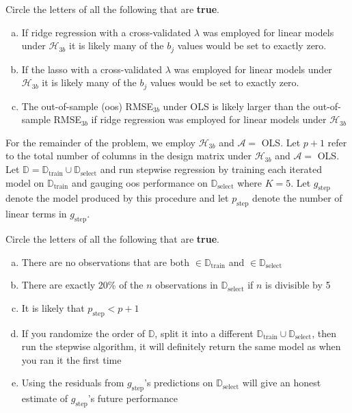 \documentclass[12pt]{article}
\begin{document}
 Circle the letters of all the following that are \textbf{true}.

\begin{enumerate}[(a)]
\item If ridge regression with a cross-validated $\lambda$ was employed for linear models under $\mathcal{H}_{3b}$ it is likely many of the $b_j$ values would be set to exactly zero.
\item If the lasso with a cross-validated $\lambda$ was employed for linear models under $\mathcal{H}_{3b}$ it is likely many of the $b_j$ values would be set to exactly zero.
\item The out-of-sample (oos) RMSE$_{3b}$ under OLS is likely larger than the out-of-sample RMSE$_{3b}$ if ridge regression was employed for linear models under $\mathcal{H}_{3b}$
\end{enumerate}

For the remainder of the problem, we employ $\mathcal{H}_{3b}$ and $\mathcal{A} = $ OLS. Let $p+1$ refer to the total number of columns in the design matrix under $\mathcal{H}_{3b}$ and $\mathcal{A} = $ OLS.\\

Let $\mathbb{D} = \mathbb{D}_{\text{train}} \cup \mathbb{D}_{\text{select}}$ and run stepwise regression by training each iterated model on $\mathbb{D}_{\text{train}}$ and gauging oos performance on $\mathbb{D}_{\text{select}}$ where $K=5$. Let $g_\text{step}$ denote the model produced by this procedure and let $p_\text{step}$ denote the number of linear terms in $g_\text{step}$.


 Circle the letters of all the following that are \textbf{true}.

\begin{enumerate}[(a)]
\item There are no observations that are both $\in \mathbb{D}_{\text{train}}$ and $\in \mathbb{D}_{\text{select}}$
\item There are exactly 20\% of the $n$ observations in $\mathbb{D}_{\text{select}}$ if $n$ is divisible by 5
\item It is likely that $p_\text{step} < p+1$
\item If you randomize the order of $\mathbb{D}$, split it into a different $\mathbb{D}_{\text{train}} \cup \mathbb{D}_{\text{select}}$, then run the stepwise algorithm, it will definitely return the same model as when you ran it the first time
\item Using the residuals from $g_\text{step}$'s predictions on $\mathbb{D}_{\text{select}}$ will give an honest estimate of $g_\text{step}$'s future performance
\end{enumerate}
\end{document}
